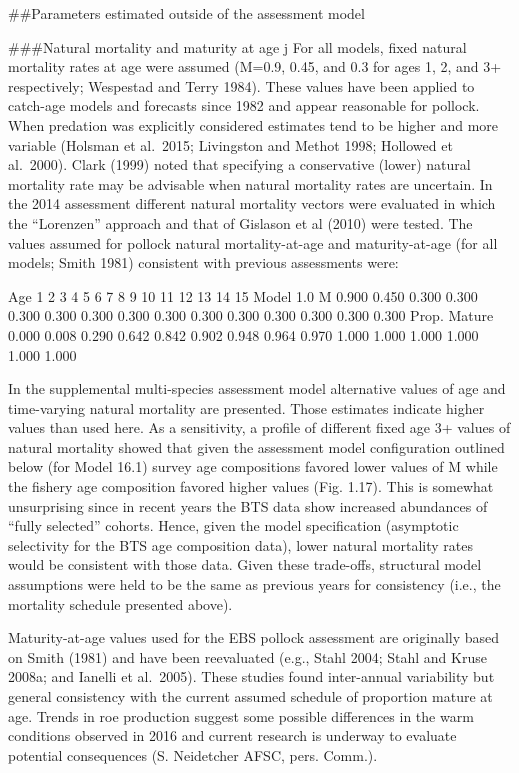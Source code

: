 \#\#Parameters estimated outside of the assessment model

\#\#\#Natural mortality and maturity at age j For all models, fixed
natural mortality rates at age were assumed (M=0.9, 0.45, and 0.3 for
ages 1, 2, and 3+ respectively; Wespestad and Terry 1984). These values
have been applied to catch-age models and forecasts since 1982 and
appear reasonable for pollock. When predation was explicitly considered
estimates tend to be higher and more variable (Holsman et al.~2015;
Livingston and Methot 1998; Hollowed et al.~2000). Clark (1999) noted
that specifying a conservative (lower) natural mortality rate may be
advisable when natural mortality rates are uncertain. In the 2014
assessment different natural mortality vectors were evaluated in which
the ``Lorenzen'' approach and that of Gislason et al (2010) were tested.
The values assumed for pollock natural mortality-at-age and
maturity-at-age (for all models; Smith 1981) consistent with previous
assessments were:

Age 1 2 3 4 5 6 7 8 9 10 11 12 13 14 15 Model 1.0 M 0.900 0.450 0.300
0.300 0.300 0.300 0.300 0.300 0.300 0.300 0.300 0.300 0.300 0.300 0.300
Prop. Mature 0.000 0.008 0.290 0.642 0.842 0.902 0.948 0.964 0.970 1.000
1.000 1.000 1.000 1.000 1.000

In the supplemental multi-species assessment model alternative values of
age and time-varying natural mortality are presented. Those estimates
indicate higher values than used here. As a sensitivity, a profile of
different fixed age 3+ values of natural mortality showed that given the
assessment model configuration outlined below (for Model 16.1) survey
age compositions favored lower values of M while the fishery age
composition favored higher values (Fig. 1.17). This is somewhat
unsurprising since in recent years the BTS data show increased
abundances of ``fully selected'' cohorts. Hence, given the model
specification (asymptotic selectivity for the BTS age composition data),
lower natural mortality rates would be consistent with those data. Given
these trade-offs, structural model assumptions were held to be the same
as previous years for consistency (i.e., the mortality schedule
presented above).

Maturity-at-age values used for the EBS pollock assessment are
originally based on Smith (1981) and have been reevaluated (e.g., Stahl
2004; Stahl and Kruse 2008a; and Ianelli et al.~2005). These studies
found inter-annual variability but general consistency with the current
assumed schedule of proportion mature at age. Trends in roe production
suggest some possible differences in the warm conditions observed in
2016 and current research is underway to evaluate potential consequences
(S. Neidetcher AFSC, pers. Comm.).

